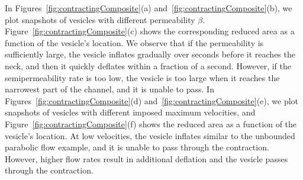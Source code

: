 \documentclass[9pt,twocolumn,twoside,lineno]{pnas-new}
\begin{document}
In Figures~\ref{fig:contractingComposite}(a)
and~\ref{fig:contractingComposite}(b), we plot snapshots of vesicles
with different permeability $\beta$.
Figure~\ref{fig:contractingComposite}(c) shows the corresponding reduced
area as a function of the vesicle's location. We observe that if the
permeability is sufficiently large, the vesicle inflates gradually over
seconds before it reaches the neck, and then it quickly deflates within
a fraction of a second. However, if the semipermeability rate is too
low, the vesicle is too large when it reaches the narrowest part of the
channel, and it is unable to pass. In
Figures~\ref{fig:contractingComposite}(d)
and~\ref{fig:contractingComposite}(e), we plot snapshots of vesicles
with different imposed maximum velocities, and
Figure~\ref{fig:contractingComposite}(f) shows the reduced area as a
function of the vesicle's location. At low velocities, the vesicle
inflates similar to the unbounded parabolic flow example, and it is
unable to pass through the contraction. However, higher flow rates
result in additional deflation and the vesicle passes through the
contraction.
\end{document}
